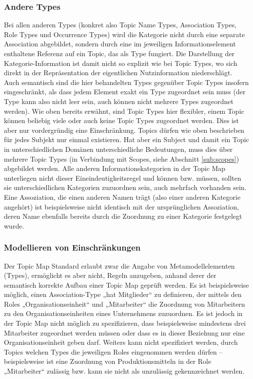\subsubsection{Andere Types}

Bei allen anderen Types (konkret also Topic Name Types, Association Types, Role Types und Occurrence Types) wird die Kategorie nicht durch eine separate Association abgebildet, sondern durch eine im jeweiligen Informationselement enthaltene Referenz auf ein Topic, das als Type fungiert. Die Darstellung der Kategorie-Information ist damit nicht so explizit wie bei Topic Types, wo sich direkt in der Repräsentation der eigentlichen Nutzinformation niederschlägt. Auch semantisch sind die hier behandelten Types gegenüber Topic Types insofern eingeschränkt, als dass jedem Element exakt ein Type zugeordnet sein muss (der Type kann also nicht leer sein, auch können nicht mehrere Types zugeordnet werden). Wie oben bereits erwähnt, sind Topic Types hier flexibler, einem Topic können beliebig viele oder auch keine Topic Types zugeordnet werden. Dies ist aber nur vordergründig eine Einschränkung. Topics dürfen wie oben beschrieben für jedes Subjekt nur einmal existieren. Hat aber ein Subject und damit ein Topic in unterschiedlichen Domänen unterschiedliche Bedeutungen, muss dies über mehrere Topic Types (in Verbindung mit Scopes, siehe Abschnitt \ref{sub:scopes}) abgebildet werden. Alle anderen Informationskategorien in der Topic Map unterliegen nicht dieser Eineindeutigkeitsregel und können bzw. müssen, sollten sie unterschiedlichen Kategorien zuzuordnen sein, auch mehrfach vorhanden sein. Eine Assoziation, die einen anderen Namen trägt (also einer anderen Kategorie angehört) ist beispielsweise nicht identisch mit der ursprünglichen Assoziation, deren Name ebenfalls bereits durch die Zuordnung zu einer Kategorie festgelegt wurde. 

\subsubsection{Modellieren von Einschränkungen}

Der Topic Map Standard erlaubt zwar die Angabe von Metamodellelementen (Types), ermöglicht es aber nicht, Regeln anzugeben, anhand derer der semantisch korrekte Aufbau einer Topic Map geprüft werden. Es ist beispielsweise möglich, einen Association-Type „hat Mitglieder“ zu definieren, der mittels den Roles „Organisationseinheit“ und „Mitarbeiter“ die Zuordnung von Mitarbeitern zu den Organisationseinheiten eines Unternehmens zuzuordnen. Es ist jedoch in der Topic Map nicht möglich zu spezifizieren, dass beispielsweise mindestens drei Mitarbeiter zugeordnet werden müssen oder dass es in dieser Beziehung nur eine Organisationseinheit geben darf. Weiters kann nicht spezifiziert werden, durch Topics welchen Types die jeweiligen Roles eingenommen werden dürfen -- beispielsweise ist eine Zuordnung von Produktionsmitteln in der Role „Mitarbeiter“ zulässig bzw. kann sie nicht als unzulässig gekennzeichnet werden.

